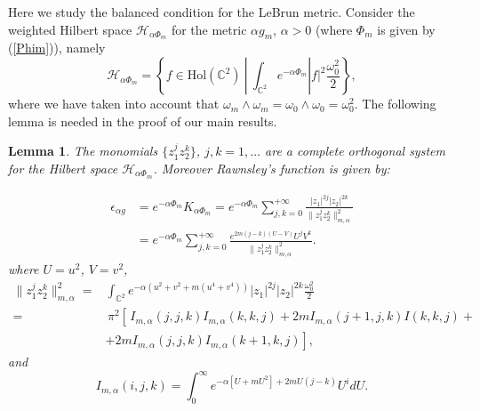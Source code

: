\documentclass[11pt, reqno]{amsart}
\newtheorem{lem}[theor]{Lemma}
\begin{document}
Here we study the balanced condition for the LeBrun metric. Consider the weighted Hilbert space
${\mathcal{H}}_{\alpha\Phi_m}$ for the  metric $\alpha g_m$, $\alpha>0$
(where $\Phi_m$ is given by (\ref{Phim})), namely
$${\mathcal{H}}_{\alpha\Phi_m}=\left\{f\in{\mathrm{Hol}}({\mathbb{C}}^2)\ | \ \int_{{\mathbb{C}}^2} e^{-\alpha\Phi_m} |f|^2 \frac{\omega_0^2}{2}\right\},$$
where we have taken into account that  $\omega_m\wedge\omega_m=\omega_0\wedge\omega_0=\omega_0^2$.
The following lemma is needed in the proof of our main results.
\begin{lem}\label{z1z2k}
The monomials  $\{z_1^j z_2^k\}$, $j, k=1, \dots $  are a complete orthogonal system for the Hilbert space
${\mathcal{H}}_{\alpha\Phi_m}$.  Moreover Rawnsley's function is given by:

\begin{equation}\label{repkern}
\begin{split}
\epsilon_{\alpha g}&=e^{-\alpha\Phi_m}K_{ \alpha\Phi_m} =e^{-\alpha\Phi_m}\sum_{j,k=0}^{+ \infty} \frac{|z_1|^{2j}|z_2|^{2k}}
{\| z_1^j z_2^k \|_{m, \alpha}^2}\\
&=e^{-\alpha\Phi_m}
\sum_{j,k=0}^{+ \infty} \frac{e^{2m(j-k)(U-V)} U^j V^k}
{\| z_1^j z_2^k \|_{m, \alpha}^2}.
\end{split}
\end{equation}
where $U = u^2$, $V = v^2$,
\begin{equation}\label{norma}
\begin{split}
\| z_1^j z_2^k \|^2_{m, \alpha}=&\int_{{\mathbb{C}}^2}e^{-\alpha \left(u^2+v^2+m(u^4+v^4)\right)}|z_1|^{2j} |z_2|^{2k}\frac{\omega_0^2}{2}\\
=&\, \pi^2\left[\, I_{m, \alpha}(j,j,k) I_{m, \alpha}(k,k,j) + 2m I_{m, \alpha}(j+1,j,k ) I(k,k,j) +\right. \\
&\left.+2m  I_{m, \alpha}(j,j,k ) I_{m, \alpha}(k+1,k,j)\right],
\end{split}
\end{equation}
and
\begin{equation}\label{ijk}
I_{m, \alpha}(i,j,k) = \int_{0}^{\infty} e^{- \alpha [U + m U^2]+ 2mU(j -k)}U^i dU.
\end{equation}
\end{lem}
\end{document}
